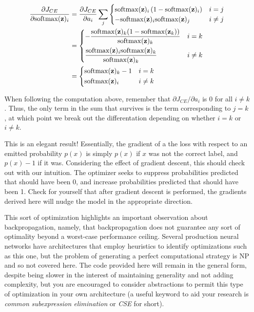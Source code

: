 \[
\begin{aligned}
	\frac{\partial J_{CE}}{\partial \mathrm{softmax}(\mathbf{z})_i} &= \frac{\partial J_{CE}}{\partial a_i}\sum_{j} \begin{cases}
		\mathrm{softmax}(\mathbf{z})_i\left(1 - \mathrm{softmax}(\mathbf{z})_i\right) & i = j \\
		-\mathrm{softmax}(\mathbf{z})_i \mathrm{softmax}(\mathbf{z})_j & i \neq j
	\end{cases} \\
	&= \begin{dcases}
		-\frac{\mathrm{softmax}(\mathbf{z})_k(1 - \mathrm{softmax}(\mathbf{z}_k))}{\mathrm{softmax}(\mathbf{z})_k} & i = k \\
		\frac{\mathrm{softmax}(\mathbf{z})_i\mathrm{softmax}(\mathbf{z})_k}{\mathrm{softmax}(\mathbf{z})_k} & i \neq k\\
	\end{dcases} \\
	&= \begin{dcases}
		\mathrm{softmax}(\mathbf{z})_k - 1 & i = k \\
		\mathrm{softmax}(\mathbf{z})_i & i \neq k
	\end{dcases}
\end{aligned}
\]

When following the computation above, remember that
\(\partial J_{CE} / \partial a_i\) is 0 for all \(i \neq k\). Thus, the
only term in the sum that survives is the term corresponding to
\(j = k\), at which point we break out the differentation depending on
whether \(i = k\) or \(i \neq k\).

This is an elegant result! Essentially, the gradient of a the loss with
respect to an emitted probability \(p(x)\) is simply \(p(x)\) if \(x\)
was not the correct label, and \(p(x) - 1\) if it was. Considering the
effect of gradient descent, this should check out with our intuition.
The optimizer seeks to suppress probabilities predicted that should have
been 0, and increase probabilities predicted that should have been 1.
Check for yourself that after gradient descent is performed, the
gradients derived here will nudge the model in the appropriate
direction.

This sort of optimization highlights an important observation about
backpropagation, namely, that backpropagation does not guarantee any
sort of optimality beyond a worst-case performance ceiling. Several
production neural networks have architectures that employ heuristics to
identify optimizations such as this one, but the problem of generating a
perfect computational strategy is NP and so not covered here. The code
provided here will remain in the general form, despite being slower in
the interest of maintaining generality and not adding complexity, but
you are encouraged to consider abstractions to permit this type of
optimization in your own architecture (a useful keyword to aid your
research is \emph{common subexpression elimination} or \emph{CSE} for
short).

